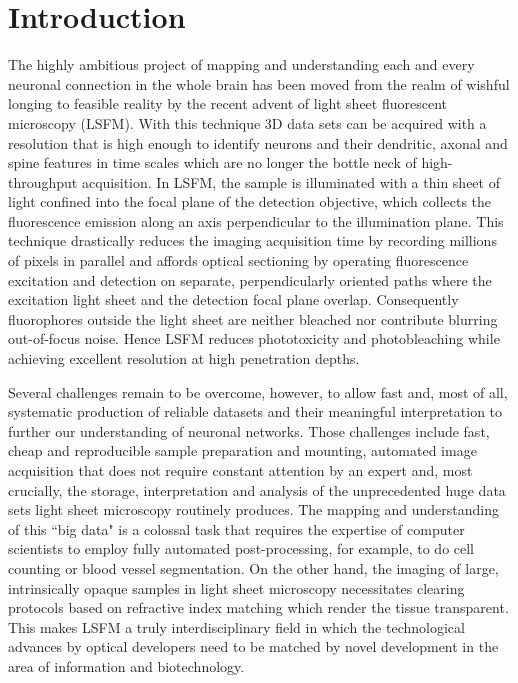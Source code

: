 \documentclass[12pt]{spieman}  %
\begin{document}
\section{Introduction}%
\label{sect:intro}  

The highly ambitious project of mapping and understanding each and every neuronal connection in the whole brain has been moved from the realm of wishful longing to feasible reality by the recent advent of light sheet fluorescent microscopy (LSFM). With this technique 3D data sets can be acquired with a resolution that is high enough to identify neurons and their dendritic, axonal and spine features in time scales which are no longer the bottle neck of high-throughput acquisition. In LSFM, the sample is illuminated with a thin sheet of light confined into the focal plane of the detection objective, which collects the fluorescence emission along an axis perpendicular to the illumination plane\cite{Huisken2009}. This technique drastically reduces the imaging acquisition time by recording millions of pixels in parallel and affords optical sectioning by operating fluorescence excitation and detection on separate, perpendicularly oriented paths where the excitation light sheet and the detection focal plane overlap. Consequently fluorophores outside the light sheet are neither bleached nor contribute blurring out-of-focus noise. Hence LSFM reduces phototoxicity and photobleaching while achieving excellent resolution at high penetration depths.

Several challenges remain to be overcome, however, to allow fast and, most of all, systematic production of reliable datasets and their meaningful interpretation to further our understanding of neuronal networks. Those challenges include fast, cheap and reproducible sample preparation and mounting, automated image acquisition that does not require constant attention by an expert and, most crucially, the storage, interpretation and analysis of the unprecedented huge data sets light sheet microscopy routinely produces. The mapping and understanding of this ``big data" is a colossal task that requires the expertise of computer scientists to employ fully automated post-processing, for example, to do cell counting or blood vessel segmentation. On the other hand, the imaging of large, intrinsically opaque samples in light sheet microscopy necessitates clearing protocols based on refractive index matching which render the tissue transparent. This makes LSFM a truly interdisciplinary field in which the technological advances by optical developers need to be matched by novel development in the area of information and biotechnology.
\end{document}
